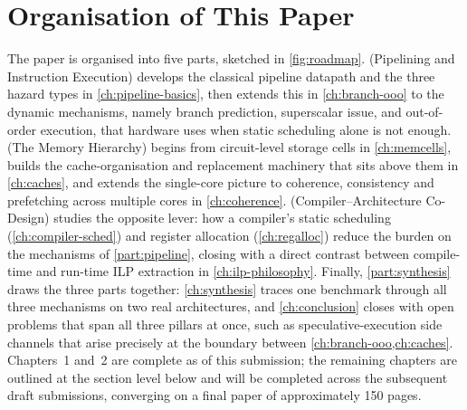 \documentclass[12pt,a4paper]{report}
\begin{document}
\section{Organisation of This Paper}
\label{sec:organisation}

The paper is organised into five parts, sketched in \cref{fig:roadmap}.
 (Pipelining and Instruction Execution) develops the
classical pipeline datapath and the three hazard types in
\cref{ch:pipeline-basics}, then extends this in \cref{ch:branch-ooo} to
the dynamic mechanisms, namely branch prediction, superscalar issue, and
out-of-order execution, that hardware uses when static scheduling alone
is not enough.  (The Memory Hierarchy) begins from
circuit-level storage cells in \cref{ch:memcells}, builds the
cache-organisation and replacement machinery that sits above them in
\cref{ch:caches}, and extends the single-core picture to coherence,
consistency and prefetching across multiple cores in \cref{ch:coherence}.
 (Compiler--Architecture Co-Design) studies the
opposite lever: how a compiler's static scheduling
(\cref{ch:compiler-sched}) and register allocation
(\cref{ch:regalloc}) reduce the burden on the mechanisms of
\cref{part:pipeline}, closing with a direct contrast between compile-time
and run-time ILP extraction in \cref{ch:ilp-philosophy}. Finally,
\cref{part:synthesis} draws the three parts together: \cref{ch:synthesis}
traces one benchmark through all three mechanisms on two real
architectures, and \cref{ch:conclusion} closes with open problems that
span all three pillars at once, such as speculative-execution side
channels that arise precisely at the boundary between
\cref{ch:branch-ooo,ch:caches}. Chapters~1 and~2 are complete as of this
submission; the remaining chapters are outlined at the section level
below and will be completed across the subsequent draft submissions,
converging on a final paper of approximately 150 pages.
\end{document}
